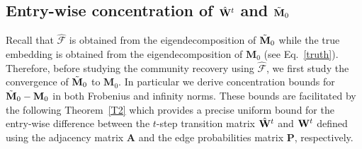 \documentclass[10pt,journal,compsoc]{IEEEtran}
\newcommand{\bds}{\boldsymbol}
\newcommand{\M}[1]{{{\mathbf{\MakeUppercase{#1}}}}}
\numberwithin{equation}{section}
\begin{document}
\subsection{Entry-wise  concentration of $\hat{\M W}^t$ and $\tilde{\M M}_0$}
\label{sec:dense}
Recall that $\hat{\bds{\mathcal{F}}}$ is obtained from the
eigendecomposition of $\tilde{\M M}_0$ while the true embedding is
obtained from the eigendecomposition of $\mathbf{M}_0$ (see Eq.~\eqref{truth}). Therefore, before studying the community recovery using $\hat{\bds{\mathcal{F}}}$, we first study the
convergence of $\tilde{\M M}_0$ to $\mathbf{M}_0$. In particular we derive concentration bounds for $\tilde{\M M}_0 - \M M_0$ in both Frobenius and infinity norms. %
These bounds are
facilitated by the following Theorem~\ref{T2} which provides a precise uniform
bound for the entry-wise difference between the $t$-step
transition matrix $\hat{\M W}^{t}$ and $\M W^{t}$ defined using the 
adjacency matrix $\mathbf{A}$ and the edge probabilities matrix $\mathbf{P}$, respectively. %
\end{document}
